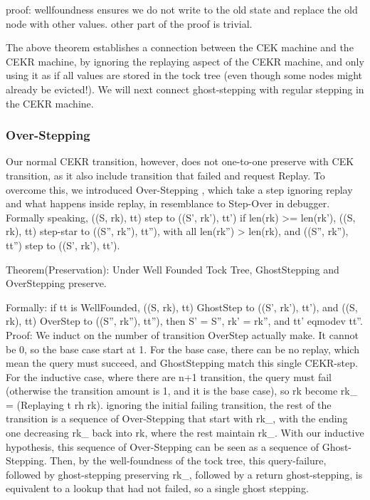
proof: wellfoundness ensures we do not write to the old state and replace the old node with other values. other part of the proof is trivial.

The above theorem establishes a connection between the CEK machine and the CEKR machine, by ignoring the replaying aspect of the CEKR machine, and only using it as if all values are stored in the tock tree (even though some nodes might already be evicted!). We will next connect ghost-stepping with regular stepping in the CEKR machine.

\subsubsection{Over-Stepping}
Our normal CEKR transition, however, does not one-to-one preserve with CEK transition, as it also include transition that failed and request Replay. To overcome this, we introduced Over-Stepping , which take a step ignoring replay and what happens inside replay, in resemblance to Step-Over in debugger. Formally speaking, ((S, rk), tt) step to ((S', rk'), tt') if len(rk) >= len(rk'), ((S, rk), tt) step-star to ((S'', rk''), tt''), with all len(rk'') > len(rk), and ((S'', rk''), tt'') step to ((S', rk'), tt'). 

Theorem(Preservation): Under Well Founded Tock Tree, GhostStepping and OverStepping preserve.

Formally: if tt is WellFounded, ((S, rk), tt) GhostStep to ((S', rk'), tt'), and ((S, rk), tt) OverStep to ((S'', rk''), tt''), then S' = S'', rk' = rk'', and tt' eqmodev tt''.
Proof: We induct on the number of transition OverStep actually make. It cannot be 0, so the base case start at 1.
For the base case, there can be no replay, which mean the query must succeed, and GhostStepping match this single CEKR-step.
For the inductive case, where there are n+1 transition, the query must fail (otherwise the transition amount is 1, and it is the base case), so rk become rk\_ = (Replaying t rh rk). ignoring the initial failing transition, the rest of the transition is a sequence of Over-Stepping that start with rk\_, with the ending one decreasing rk\_ back into rk, where the rest maintain rk\_. With our inductive hypothesis, this sequence of Over-Stepping can be seen as a sequence of Ghost-Stepping. Then, by the well-foundness of the tock tree, this query-failure, followed by ghost-stepping preserving rk\_, followed by a return ghost-stepping, is equivalent to a lookup that had not failed, so a single ghost stepping.

